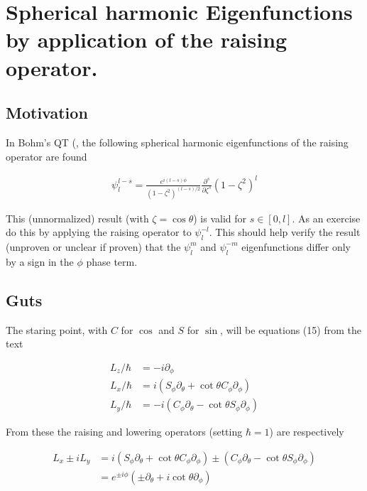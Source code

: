 %

\chapter{Spherical harmonic Eigenfunctions by application of the raising operator.}
\label{chap:sphericalHarmonicRaising}
{}
\date{Aug 18, 2009}

\beginArtNoToc

\section{Motivation}

In Bohm's QT (\citep{bohm1989qt}, the following spherical harmonic eigenfunctions of the raising operator are found

\begin{align}\label{eqn:sphericalHarmonicRaising:foo0}
\psi_l^{l-s} = \frac{e^{i(l-s)\phi}}{(1-\zeta^2)^{(l-s)/2}} \frac{\partial^s}{\partial \zeta^s} (1-\zeta^2)^l
\end{align}

This (unnormalized) result (with $\zeta = \cos\theta$) is valid for $s \in [0,l]$.  As an exercise do this by applying the raising operator to $\psi_l^{-l}$.  This should help verify the result (unproven or unclear if proven) that the $\psi_l^m$ and $\psi_l^{-m}$ eigenfunctions differ only by a sign in the $\phi$ phase term.

\section{Guts}

The staring point, with $C$ for $\cos$ and $S$ for $\sin$, will be equations (15) from the text

\begin{align*}
L_z/\hbar &= -i \partial_\phi \\
L_x/\hbar &= i (S_\phi \partial_\theta + \cot\theta C_\phi \partial_\phi) \\
L_y/\hbar &= -i (C_\phi \partial_\theta - \cot\theta S_\phi \partial_\phi)
\end{align*}

From these the raising and lowering operators (setting $\hbar=1$) are respectively

\begin{align*}
L_x \pm iL_y
&= 
i (S_\phi \partial_\theta + \cot\theta C_\phi \partial_\phi)
\pm (C_\phi \partial_\theta - \cot\theta S_\phi \partial_\phi) \\
&= e^{\pm i\phi} (\pm \partial_\theta + i \cot\theta \partial_\phi )
\end{align*}

